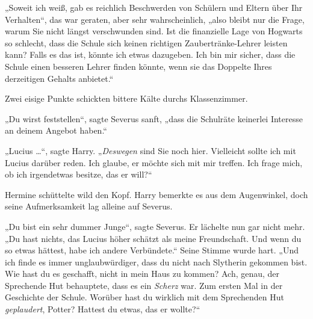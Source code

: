 „Soweit ich weiß, gab es reichlich Beschwerden von Schülern und Eltern über Ihr Verhalten“, das war geraten, aber sehr wahrscheinlich, „also bleibt nur die Frage, warum Sie nicht längst verschwunden sind. Ist die finanzielle Lage von Hogwarts so schlecht, dass die Schule sich keinen richtigen Zaubertränke-Lehrer leisten kann? Falls es das ist, könnte ich etwas dazugeben. Ich bin mir sicher, dass die Schule einen besseren Lehrer finden könnte, wenn sie das Doppelte Ihres derzeitigen Gehalts anbietet.“ 

Zwei eisige Punkte schickten bittere Kälte durchs Klassenzimmer. 

„Du wirst feststellen“, sagte Severus sanft, „dass die Schulräte keinerlei Interesse an deinem Angebot haben.“ 

„Lucius …“, sagte Harry. „\emph{Deswegen} sind Sie noch hier. Vielleicht sollte ich mit Lucius darüber reden. Ich glaube, er möchte sich mit mir treffen. Ich frage mich, ob ich irgendetwas besitze, das er will?“ 

Hermine schüttelte wild den Kopf. Harry bemerkte es aus dem Augenwinkel, doch seine Aufmerksamkeit lag alleine auf Severus. 

„Du bist ein sehr dummer Junge“, sagte Severus. Er lächelte nun gar nicht mehr. „Du hast nichts, das Lucius höher schätzt als meine Freundschaft. Und wenn du so etwas hättest, habe ich andere Verbündete.“ Seine Stimme wurde hart. „Und ich finde es immer unglaubwürdiger, dass du nicht nach Slytherin gekommen bist. Wie hast du es geschafft, nicht in mein Haus zu kommen? Ach, genau, der Sprechende Hut behauptete, dass es ein \emph{Scherz} war. Zum ersten Mal in der Geschichte der Schule. Worüber hast du wirklich mit dem Sprechenden Hut \emph{geplaudert}, Potter? Hattest du etwas, das er wollte?“ 

